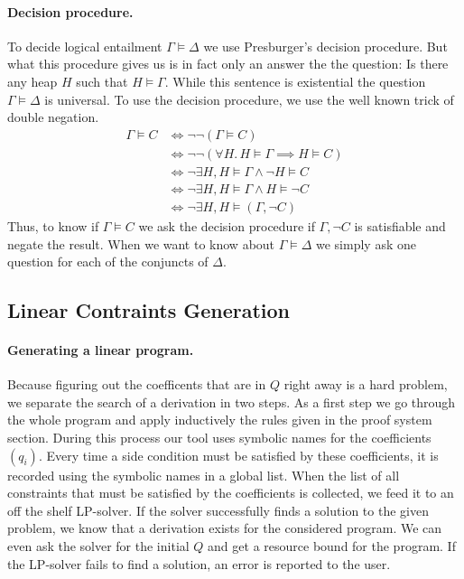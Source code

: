 \documentclass[nocopyrightspace,preprint]{sigplanconf}
\begin{document}
\paragraph{Decision procedure.}
To decide logical entailment $\Gamma \models \Delta$ we use
Presburger's decision procedure.  But what this procedure gives us
is in fact only an answer the the question: Is there any heap $H$
such that $H \models \Gamma$.  While this sentence is existential
the question $\Gamma \models \Delta$ is universal.  To use the
decision procedure, we use the well known trick of double negation.
\begin{align*}
\Gamma \models C
&\Leftrightarrow \neg\neg (\Gamma \models C) \\
&\Leftrightarrow \neg\neg (\forall H.\, H\models\Gamma \implies H\models C) \\
&\Leftrightarrow \neg \exists H, H\models\Gamma \land \neg H\models C \\
&\Leftrightarrow \neg \exists H, H\models\Gamma \land H\models \neg C \\
&\Leftrightarrow \neg \exists H, H\models (\Gamma, \neg C)
\end{align*}
Thus, to know if $\Gamma \models C$ we ask the decision
procedure if $\Gamma, \neg C$ is satisfiable and negate the result.
When we want to know about $\Gamma \models \Delta$ we simply ask
one question for each of the conjuncts of $\Delta$.

\subsection{Linear Contraints Generation}

\paragraph{Generating a linear program.}
Because figuring out the coefficents that are in $Q$ right away is a hard
problem, we separate the search of a derivation in two steps.  As a first
step we go through the whole program and apply inductively the rules
given in the proof system section.  During this process our tool uses
symbolic names for the coefficients $(q_i)$.  Every time a side condition
must be satisfied by these coefficients, it is recorded using the symbolic
names in a global list.  When
the list of all constraints that must be satisfied by the coefficients is
collected, we feed it to an off the shelf LP-solver.  If the solver successfully
finds a solution to the given problem, we know that a derivation
exists for the considered program.  We can even ask the solver
for the initial $Q$ and get a resource bound for the program.
If the LP-solver fails to find a solution, an error is reported to the
user.
\end{document}
